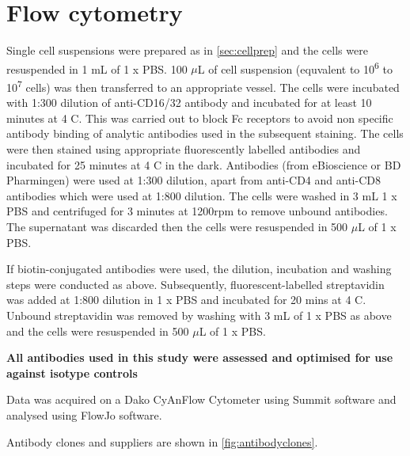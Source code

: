 \section{Flow cytometry}

Single cell suspensions were prepared as in \cref{sec:cellprep} and the cells were resuspended in 1 mL of 1 x PBS.
100 $\mu$L of cell suspension (equvalent to 10\textsuperscript{6} to 10\textsuperscript{7} cells) was then transferred to an appropriate vessel.
The cells were incubated with 1:300 dilution of anti-CD16/32 antibody and incubated for at least 10 minutes at 4 \textdegree C.
This was carried out to block Fc receptors to avoid non specific antibody binding of analytic antibodies used in the subsequent staining.
The cells were then stained using appropriate fluorescently labelled antibodies and incubated for 25 minutes at 4 \textdegree C in the dark.
Antibodies (from eBioscience or BD Pharmingen) were used at 1:300 dilution, apart from anti-CD4 and anti-CD8 antibodies which were used at 1:800 dilution. 
The cells were washed in 3 mL 1 x PBS and centrifuged for 3 minutes at 1200rpm to remove unbound antibodies.
The supernatant was discarded then the cells were resuspended in 500 $\mu$L of 1 x PBS.

If biotin-conjugated antibodies were used, the dilution, incubation and washing steps were conducted as above.
Subsequently, fluorescent-labelled streptavidin was added at 1:800 dilution in 1 x PBS and incubated for 20 mins at 4 \textdegree C.
Unbound streptavidin was removed by washing with 3 mL of 1 x PBS as above and the cells were resuspended in 500 $\mu$L of 1 x PBS.


\textbf{All antibodies used in this study were assessed and optimised for use against isotype controls}

Data was acquired on a Dako CyAn\texttrademark  Flow Cytometer using Summit software and analysed using FlowJo software.

Antibody clones and suppliers are shown in \cref{fig:antibodyclones}. 


